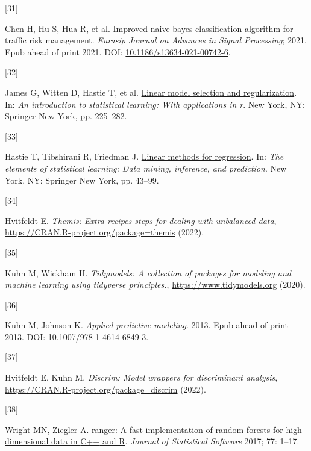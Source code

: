 \documentclass[
  10pt,
]{article}
\newlength{\cslhangindent}
\newlength{\csllabelwidth}
\newlength{\cslentryspacingunit} %
\newenvironment{CSLReferences}[2] %
 {%
  \setlength{\parindent}{0pt}
  \ifodd #1
  \let\oldpar\par
  \def\par{\hangindent=\cslhangindent\oldpar}
  \fi
  \setlength{\parskip}{#2\cslentryspacingunit}
 }%
 {}
\newcommand{\CSLLeftMargin}[1]{\parbox[t]{\csllabelwidth}{#1}}
\newcommand{\CSLRightInline}[1]{\parbox[t]{\linewidth - \csllabelwidth}{#1}\break}
\begin{document}
\begin{CSLReferences}{0}{0}
\leavevmode{}%
\CSLLeftMargin{{[}31{]} }%
\CSLRightInline{Chen H, Hu S, Hua R, et al. Improved naive bayes classification algorithm for traffic risk management. \emph{Eurasip Journal on Advances in Signal Processing}; 2021. Epub ahead of print 2021. DOI: \href{https://doi.org/10.1186/s13634-021-00742-6}{10.1186/s13634-021-00742-6}.}

\leavevmode{}%
\CSLLeftMargin{{[}32{]} }%
\CSLRightInline{James G, Witten D, Hastie T, et al. \href{https://doi.org/10.1007/978-1-4614-7138-7_6}{Linear model selection and regularization}. In: \emph{An introduction to statistical learning: With applications in r}. New York, NY: Springer New York, pp. 225--282.}

\leavevmode{}%
\CSLLeftMargin{{[}33{]} }%
\CSLRightInline{Hastie T, Tibshirani R, Friedman J. \href{https://doi.org/10.1007/978-0-387-84858-7_3}{Linear methods for regression}. In: \emph{The elements of statistical learning: Data mining, inference, and prediction}. New York, NY: Springer New York, pp. 43--99.}

\leavevmode{}%
\CSLLeftMargin{{[}34{]} }%
\CSLRightInline{Hvitfeldt E. \emph{Themis: Extra recipes steps for dealing with unbalanced data}, \url{https://CRAN.R-project.org/package=themis} (2022).}

\leavevmode{}%
\CSLLeftMargin{{[}35{]} }%
\CSLRightInline{Kuhn M, Wickham H. \emph{Tidymodels: A collection of packages for modeling and machine learning using tidyverse principles.}, \url{https://www.tidymodels.org} (2020).}

\leavevmode{}%
\CSLLeftMargin{{[}36{]} }%
\CSLRightInline{Kuhn M, Johnson K. \emph{Applied predictive modeling}. 2013. Epub ahead of print 2013. DOI: \href{https://doi.org/10.1007/978-1-4614-6849-3}{10.1007/978-1-4614-6849-3}.}

\leavevmode{}%
\CSLLeftMargin{{[}37{]} }%
\CSLRightInline{Hvitfeldt E, Kuhn M. \emph{Discrim: Model wrappers for discriminant analysis}, \url{https://CRAN.R-project.org/package=discrim} (2022).}

\leavevmode{}%
\CSLLeftMargin{{[}38{]} }%
\CSLRightInline{Wright MN, Ziegler A. \href{https://doi.org/10.18637/jss.v077.i01}{{ranger}: A fast implementation of random forests for high dimensional data in {C++} and {R}}. \emph{Journal of Statistical Software} 2017; 77: 1--17.}


\end{CSLReferences}
\end{document}
